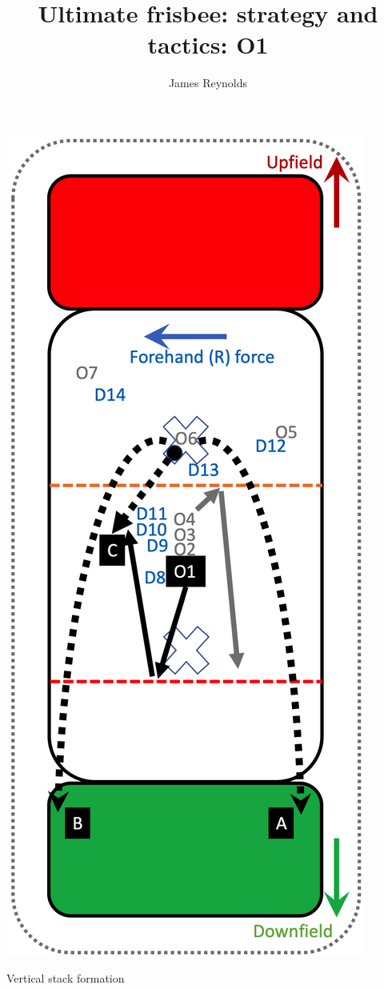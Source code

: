 \documentclass{tufte-handout}
\title{Ultimate frisbee: strategy and tactics: O1}
\author[James Reynolds]{James Reynolds}
\begin{document}
\maketitle%


\begin{marginfigure}%
  \includegraphics[width=\linewidth]{O1-vertical}
  \caption{Vertical stack formation}
  \label{fig:O1-vertical}
\end{marginfigure}
\end{document}
